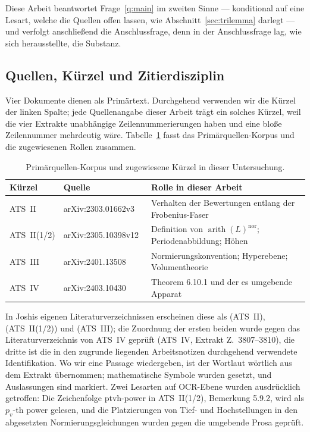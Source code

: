 \documentclass[11pt,a4paper]{article}
\theoremstyle{definition}
\theoremstyle{plain}
\theoremstyle{definition}
\newcommand{\arith}{\operatorname{arith}}
\newcommand{\anchor}[2]{(#1, Extrakt Z.~#2)}
\begin{document}
Diese Arbeit beantwortet Frage~\ref{q:main} im zweiten Sinne --- konditional auf
eine Lesart, welche die Quellen offen lassen, wie Abschnitt~\ref{sec:trilemma}
darlegt --- und verfolgt anschließend die Anschlussfrage, denn in der
Anschlussfrage lag, wie sich herausstellte, die Substanz.

\subsection{Quellen, Kürzel und Zitierdisziplin}
\label{sec:sources}

Vier Dokumente dienen als Primärtext. Durchgehend verwenden wir die Kürzel der
linken Spalte; jede Quellenangabe dieser Arbeit trägt ein solches Kürzel, weil die
vier Extrakte unabhängige Zeilennummerierungen haben und eine bloße Zeilennummer
mehrdeutig wäre. Tabelle~\ref{tab:sources} fasst das Primärquellen-Korpus und die zugewiesenen Rollen zusammen.

\begin{table}[htbp]
\centering
\caption{Primärquellen-Korpus und zugewiesene Kürzel in dieser Untersuchung.}
\label{tab:sources}
\small
\begin{tabular}{@{}lll@{}}
\toprule
Kürzel & Quelle & Rolle in dieser Arbeit \\
\midrule
ATS~II & arXiv:2303.01662v3~\cite{JoshiATSII}
  & Verhalten der Bewertungen entlang der Frobenius-Faser \\
ATS~II(1/2) & arXiv:2305.10398v12~\cite{JoshiATSIIhalf}
  & Definition von $\arith(L)^{\mathrm{nor}}$; Periodenabbildung; Höhen \\
ATS~III & arXiv:2401.13508~\cite{JoshiATSIII}
  & Normierungskonvention; Hyperebene; Volumentheorie \\
ATS~IV & arXiv:2403.10430~\cite{JoshiATSIV}
  & Theorem 6.10.1 und der es umgebende Apparat \\
\bottomrule
\end{tabular}
\end{table}

In Joshis eigenen Literaturverzeichnissen erscheinen diese als \glqq [Joshi,
2023b]\grqq{} (ATS~II), \glqq [Joshi, 2023a]\grqq{} (ATS~II(1/2)) und \glqq [Joshi,
2024c]\grqq{} (ATS~III); die Zuordnung der ersten beiden wurde gegen das
Literaturverzeichnis von ATS~IV geprüft \anchor{ATS~IV}{3807--3810}, die dritte ist
die in den zugrunde liegenden Arbeitsnotizen durchgehend verwendete Identifikation.
Wo wir eine Passage wiedergeben, ist der Wortlaut wörtlich aus dem Extrakt
übernommen; mathematische Symbole wurden gesetzt, und Auslassungen sind markiert.
Zwei Lesarten auf OCR-Ebene wurden ausdrücklich getroffen: Die Zeichenfolge
\glqq ptvh-power\grqq{} in ATS~II(1/2), Bemerkung 5.9.2, wird als \glqq $p_v$-th
power\grqq{} gelesen, und die Platzierungen von Tief- und Hochstellungen in den
abgesetzten Normierungsgleichungen wurden gegen die umgebende Prosa geprüft.
\end{document}
